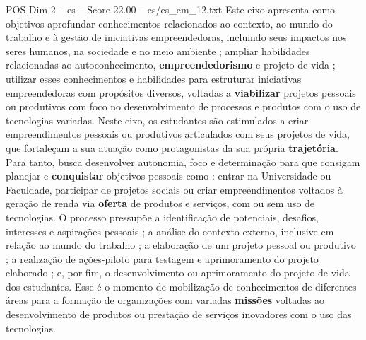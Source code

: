 \begin{textsample}{POS Dim 2 – es – Score 22.00 – es/es\_em\_12.txt}
Este eixo apresenta como objetivos aprofundar conhecimentos relacionados ao contexto, ao mundo do trabalho e à gestão de iniciativas empreendedoras, incluindo seus impactos nos seres humanos, na sociedade e no meio ambiente ; ampliar habilidades relacionadas ao autoconhecimento, \textbf{empreendedorismo} e projeto de vida ; utilizar esses conhecimentos e habilidades para estruturar iniciativas empreendedoras com propósitos diversos, voltadas a \textbf{viabilizar} projetos pessoais ou produtivos com foco no desenvolvimento de processos e produtos com o uso de tecnologias variadas.
Neste eixo, os estudantes são estimulados a criar empreendimentos pessoais ou produtivos articulados com seus projetos de vida, que fortaleçam a sua atuação como protagonistas da sua própria \textbf{trajetória}.
Para tanto, busca desenvolver autonomia, foco e determinação para que consigam planejar e \textbf{conquistar} objetivos pessoais como : entrar na Universidade ou Faculdade, participar de projetos sociais ou criar empreendimentos voltados à geração de renda via \textbf{oferta} de produtos e serviços, com ou sem uso de tecnologias.
O processo pressupõe a identificação de potenciais, desafios, interesses e aspirações pessoais ; a análise do contexto externo, inclusive em relação ao mundo do trabalho ; a elaboração de um projeto pessoal ou produtivo ; a realização de ações-piloto para testagem e aprimoramento do projeto elaborado ; e, por fim, o desenvolvimento ou aprimoramento do projeto de vida dos estudantes.
Esse é o momento de mobilização de conhecimentos de diferentes áreas para a formação de organizações com variadas \textbf{missões} voltadas ao desenvolvimento de produtos ou prestação de serviços inovadores com o uso das tecnologias.

\end{textsample}
